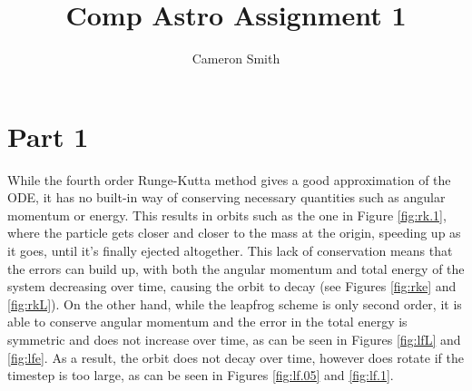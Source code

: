 \documentclass{article}
\title{Comp Astro Assignment 1}
\author{Cameron Smith }
\begin{document}
\maketitle

\section*{Part 1}

While the fourth order Runge-Kutta method gives a good approximation of the ODE, it has no built-in way of
conserving necessary quantities such as angular momentum or energy. This results
in orbits such as the one in Figure \ref{fig:rk.1}, where the particle
gets closer and closer to the mass at the origin, speeding up as it goes, until
it's finally ejected altogether. This lack of conservation means that the errors
can build up, with both the angular momentum and total energy of the system
decreasing over time, causing the orbit to decay (see Figures \ref{fig:rke}
and \ref{fig:rkL}). On the other hand, while the leapfrog scheme is only second
order, it is able to conserve angular momentum and the error in the total
energy is symmetric and does not increase over time, as can be seen
in Figures \ref{fig:lfL} and \ref{fig:lfe}. As a result, the orbit does not
decay over time, however does rotate if the timestep is too large, as can be
seen in Figures \ref{fig:lf.05} and \ref{fig:lf.1}.
\end{document}
